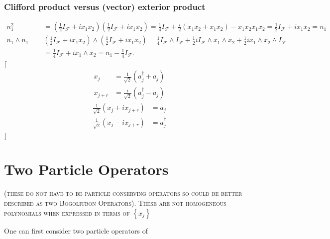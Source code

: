 \documentclass[aps, preprint]{revtex4}
\begin{document}
\subsubsection{Clifford product versus (vector) exterior product}
\begin{align}n_{1}^{2} &  =\left (\frac{1}{2} I_{\mathcal{F}} +i x_{1} x_{2}\right ) \left (\frac{1}{2} I_{\mathcal{F}} +i x_{1} x_{2}\right ) =\frac{1}{4} I_{\mathcal{F}} +\frac{i}{2} \left (x_{1} x_{2} +x_{1} x_{2}\right ) -x_{1} x_{2} x_{1} x_{2} =\frac{1}{2} I_{\mathcal{F}} +i x_{1} x_{2} =n_{1} \\
n_{1} \wedge n_{1} = & \left (\frac{1}{2} I_{\mathcal{F}} +i x_{1} x_{2}\right ) \wedge \left (\frac{1}{2} I_{\mathcal{F}} +i x_{1} x_{2}\right ) =\frac{1}{4} I_{\mathcal{F}} \wedge I_{\mathcal{F}} +\frac{1}{2} i I_{\mathcal{F}} \wedge x_{1} \wedge x_{2} +\frac{1}{2} i x_{1} \wedge x_{2} \wedge I_{\mathcal{F}} \\
 &  =\frac{1}{4} I_{\mathcal{F}} +i x_{1} \wedge x_{2} =n_{1} -\frac{1}{4} I_{\mathcal{F}}\text{.}\end{align}$\lceil $
\begin{align}x_{j} &  =\frac{1}{\sqrt{2}} \left (a_{j}^{ \dag } +a_{j}\right ) \\
x_{j +r} &  =\frac{i}{\sqrt{2}} \left (a_{j}^{ \dag } -a_{j}\right )\end{align}
\begin{align}\frac{1}{\sqrt{2}} \left (x_{j} +i x_{j +r}\right ) &  =a_{j} \\
\frac{1}{\sqrt{2}} \left (x_{j} -i x_{j +r}\right ) &  =a_{j}^{ \dag }\end{align}$\rfloor $ 

\section{Two Particle Operators}
\textsc{(these do not have to be particle conserving operators so could be better described as two Bogoliubon Operators). These are not homogeneous
polynomials when expressed in terms of }$\left \{x_{j}\right \}$ 

One can first consider two particle operators of 
\end{document}
